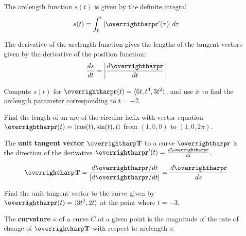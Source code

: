\documentclass[letterpaper, twoside, 12pt]{book}
\begin{document}
\begin{theorem}
The arclength function $s(t)$ is given by the definite integral
\[
  s(t)
    =
  \int_0^t |\vect{r}'(\tau)| \dvar{\tau}
\]
\end{theorem}

\begin{theorem}
The derivative of the arclength function gives the lengths of
the tangent vectors given by the derivative of the position function:
\[
  \frac{ds}{dt} = \left|\frac{d\vect{r}}{dt}\right|
\]
\end{theorem}

          \begin{problem}
            Compute $s(t)$ for $\vect{r}(t)=\<6t, t^3, 3t^2\>$,
            and use it to find the arclength parameter corresponding
            to $t=-2$.
          \end{problem}

          \begin{solution}

          \end{solution}

          \begin{problem}
            Find the length of an arc of the circular helix with
            vector equation
            $\vect{r}(t) = \<\cos(t),\sin(t),t\>$
            from $(1,0,0)$ to $(1,0,2\pi)$.
          \end{problem}

\begin{definition}
  The \textbf{unit tangent vector} $\vect{T}$ to a curve $\vect{r}$ is the
  direction of the derivative $\vect{r}'(t)=\frac{d\vect{r}}{dt}$.
\end{definition}

\begin{theorem}
  \[
    \vect{T} = \frac{d\vect{r}/dt}{|d\vect{r}/dt|} = \frac{d\vect{r}}{ds}
  \]
\end{theorem}

          \begin{problem}
            Find the unit tangent vector to the curve given by
            $\vect{r}(t)=\<3t^2,2t\>$ at the point where $t=-3$.
          \end{problem}

          \begin{solution}

          \end{solution}

\begin{definition}
  The \textbf{curvature} $\kappa$ of a curve $C$ at a given point is
  the magnitude of the rate of change of $\vect{T}$ with respect to
  arclength $s$.
\end{definition}
\end{document}
